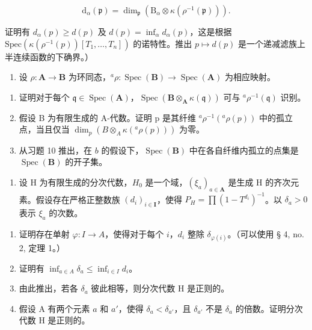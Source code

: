 \[
\mathrm{d} _ {\alpha} (\mathfrak {p}) = \dim_ {\mathfrak {p}} \left(\mathrm{B} _ {\alpha} \otimes \kappa \left(\rho^ {- 1} (\mathfrak {p})\right)\right).
\]

  证明有 \(d_{\alpha}(p) \geqslant d(p)\) 及 \(d(p) = \inf_{\alpha} d_{\alpha}(p)\)，这是根据 \(\text{Spec}(\kappa(\rho^{-1}(p))[T_1, \ldots, T_n])\) 的诺特性。推出 \(p \mapsto d(p)\) 是一个递减滤族上半连续函数的下确界。）

\begin{enumerate}
\def\labelenumi{\arabic{enumi})}
\setcounter{enumi}{10}
\tightlist
\item
  设 \(\rho: \mathbf{A} \to \mathbf{B}\) 为环同态，\(^a\rho: \operatorname{Spec}(\mathbf{B}) \to \operatorname{Spec}(\mathbf{A})\) 为相应映射。
\end{enumerate}

\begin{enumerate}
\def\labelenumi{\alph{enumi})}
\item
  证明对于每个 \(\mathfrak{q} \in \operatorname{Spec}(\mathbf{A})\)，\(\operatorname{Spec}(\mathbf{B} \otimes_{\mathbf{A}} \kappa(\mathfrak{q}))\) 可与 \(^a\rho^{-1}(\mathfrak{q})\) 识别。
\item
  假设 B 为有限生成的 A-代数。证明 p 是其纤维 \(^a\rho^{-1}(^a\rho(p))\) 中的孤立点，当且仅当 \(\dim_p(B \otimes_A \kappa(^a\rho(p)))\) 为零。
\item
  从习题 10 推出，在 \(b\) 的假设下，\(\operatorname{Spec}(\mathbf{B})\) 中在各自纤维内孤立的点集是 \(\operatorname{Spec}(\mathbf{B})\) 的开子集。
\end{enumerate}

\begin{enumerate}
\def\labelenumi{\arabic{enumi})}
\setcounter{enumi}{11}
\tightlist
\item
  设 H 为有限生成的分次代数，\(H_{0}\) 是一个域，\((\xi_{a})_{a\in\mathbf{A}}\) 是生成 H 的齐次元素。假设存在严格正整数族 \((d_{i})_{i\in\mathbf{I}}\)，使得 \(P_{H}=\prod(1-T^{d_{i}})^{-1}\)。以 \(\delta_{a}>0\) 表示 \(\xi_{a}\) 的次数。
\end{enumerate}

\begin{enumerate}
\def\labelenumi{\alph{enumi})}
\item
  证明存在单射 \(\varphi: I \to A\)，使得对于每个 \(i\)，\(d_i\) 整除 \(\delta_{\varphi(i)}\)。（可以使用 § 4, no. 2, 定理 1。）
\item
  证明有 \(\inf_{a \in A} \delta_a \leqslant \inf_{i \in I} d_i\)。
\item
  由此推出，若各 \(\delta_{a}\) 彼此相等，则分次代数 H 是正则的。
\item
  假设 A 有两个元素 \(a\) 和 \(a'\)，使得 \(\delta_{a} < \delta_{a'}\)，且 \(\delta_{a'}\) 不是 \(\delta_{a}\) 的倍数。证明分次代数 H 是正则的。
\end{enumerate}

